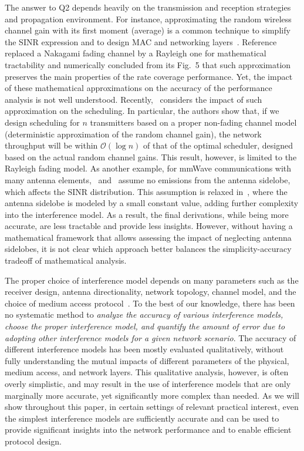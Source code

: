 \documentclass[12pt, draftclsnofoot, onecolumn]{IEEEtran}
\begin{document}
The answer to Q2 depends heavily on the transmission and reception strategies and propagation environment. For instance, approximating the random wireless channel gain with its first moment (average) is a common technique to simplify the SINR expression and to design MAC and networking layers~\cite{cardieri2010modeling,weber2007transmission,badia2008general,chen2006cross,Singh2011Interference,Singh2009Blockage,Stahlbuhk2016Topology}. Reference~\cite{Gupta2016Sharing} replaced a Nakagami fading channel by a Rayleigh one for mathematical tractability and numerically concluded from its Fig.~5 that such approximation preserves the main properties of the rate coverage performance. Yet, the impact of these mathematical approximations on the accuracy of the performance analysis is not well understood. Recently,~\cite{Dams2015Scheduling} considers the impact of such approximation on the scheduling. In particular, the authors show that, if we design scheduling for $n$ transmitters based on a proper non-fading channel model (deterministic approximation of the random channel gain), the network throughput will be within $\mathcal{O}(\log n)$ of that of the optimal scheduler, designed based on the actual random channel gains. This result, however, is limited to the Rayleigh fading model. As another example, for mmWave communications with many antenna elements,~\cite{Singh2011Interference} and~\cite{Shokri2015Transitional} assume no emissions from the antenna sidelobe, which affects the SINR distribution. This assumption is relaxed in~\cite{di2014stochastic}, where the antenna sidelobe is modeled by a small constant value, adding further complexity into the interference model. As a result, the final derivations, while being more accurate, are less tractable and provide less insights. However, without having a mathematical framework that allows assessing the impact of neglecting antenna sidelobes, it is not clear which approach better balances the simplicity-accuracy tradeoff of mathematical analysis.

The proper choice of interference model depends on many parameters such as the receiver design, antenna directionality, network topology, channel model, and the choice of medium access protocol~\cite{badia2008general,iyer2009right,cardieri2010modeling}. To the best of our knowledge, there has been no systematic method to \textit{analyze the accuracy of various interference models, choose the proper interference model, and quantify the amount of error due to adopting other interference models for a given network scenario}. The accuracy of different interference models has been mostly evaluated qualitatively, without fully understanding the mutual impacts of different parameters of the physical, medium access, and network layers. This qualitative analysis, however, is often overly simplistic, and may result in the use of interference models that are only marginally more accurate, yet significantly more complex than needed. As we will show throughout this paper, in certain settings of relevant practical interest, even the simplest interference models are sufficiently accurate and can be used to provide significant insights into the network performance and to enable efficient protocol design.
\end{document}
